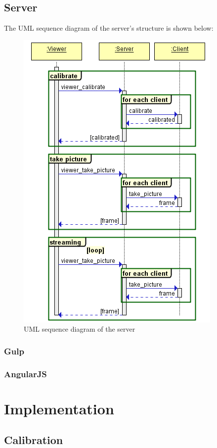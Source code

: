 \documentclass{article}
\begin{document}
\subsection{Server}
The UML sequence diagram of the server's structure is shown below:
\begin{figure}[h]
  \centering
  \includegraphics[scale=0.6]{serverUML}
  \caption{UML sequence diagram of the server}
\end{figure}
\subsubsection{Gulp} %
\subsubsection{AngularJS}

\newpage
\section{Implementation}
\subsection{Calibration}
\end{document}
